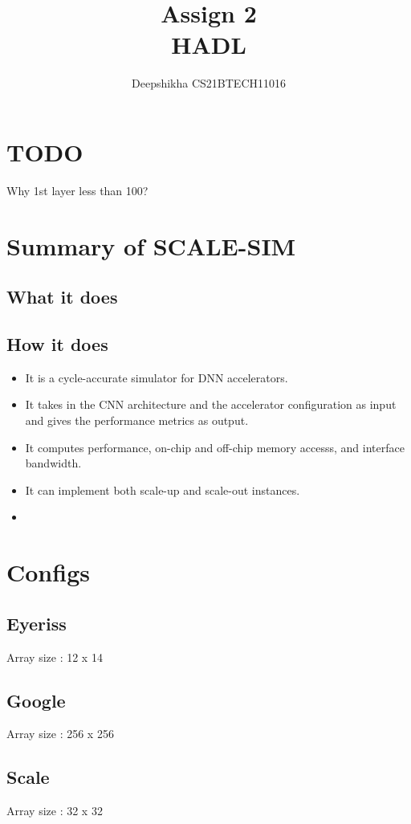 \documentclass[12pt]{article}
\title{ 
{\Huge{ Assign  2
\\
HADL}} 
}
\date{}
\begin{document}
\author{
Deepshikha  CS21BTECH11016
}
\maketitle


\section{TODO}
Why 1st layer less than 100?

\section{Summary of SCALE-SIM}

\subsection{What it does}
\subsection{How it does}

\begin{itemize}
    \item It is a cycle-accurate simulator for DNN accelerators.
    \item It takes in the CNN architecture and the accelerator configuration as input and gives the performance metrics as output.
    \item It computes performance, on-chip and off-chip memory accesss, and interface bandwidth.
    \item It can implement both scale-up and scale-out instances.
    \item 
\end{itemize}


\section{Configs}


\subsection{Eyeriss}
Array size : 12 x 14
\subsection{Google}
Array size : 256 x 256
\subsection{Scale}
Array size : 32 x 32
\end{document}
